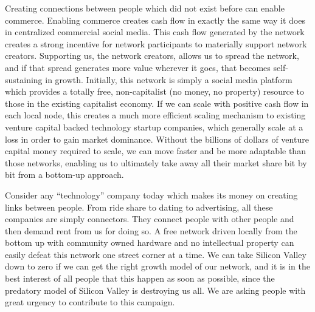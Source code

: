 Creating connections between people which did not exist before can
enable commerce. Enabling commerce creates cash flow in exactly the same
way it does in centralized commercial social media. This cash flow
generated by the network creates a strong incentive for network
participants to materially support network creators. Supporting us, the
network creators, allows us to spread the network, and if that spread
generates more value wherever it goes, that becomes self-sustaining in
growth. Initially, this network is simply a social media platform which
provides a totally free, non-capitalist (no money, no property) resource
to those in the existing capitalist economy. If we can scale with
positive cash flow in each local node, this creates a much more
efficient scaling mechanism to existing venture capital backed
technology startup companies, which generally scale at a loss in order
to gain market dominance. Without the billions of dollars of venture
capital money required to scale, we can move faster and be more
adaptable than those networks, enabling us to ultimately take away all
their market share bit by bit from a bottom-up approach.

Consider any ``technology'' company today which makes its money on
creating links between people. From ride share to dating to advertising,
all these companies are simply connectors. They connect people with
other people and then demand rent from us for doing so. A free network
driven locally from the bottom up with community owned hardware and no
intellectual property can easily defeat this network one street corner
at a time. We can take Silicon Valley down to zero if we can get the
right growth model of our network, and it is in the best interest of all
people that this happen as soon as possible, since the predatory model
of Silicon Valley is destroying us all. We are asking people with great
urgency to contribute to this campaign.
